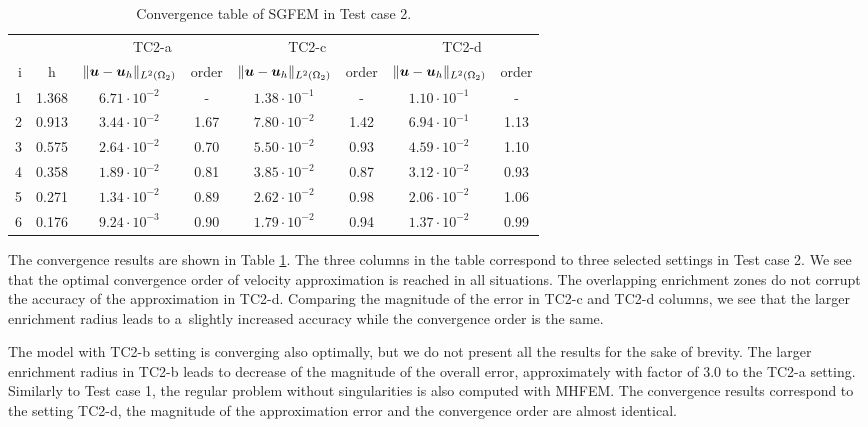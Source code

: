 \begin{table}[!htb]
\begin{center}
\bgroup
\def\arraystretch{1.2}
\setlength\tabcolsep{5pt}
\begin{tabular}{rc|cc|cc|cc}
\toprule
\multicolumn{2}{c|}{} & \multicolumn{2}{c|}{ TC2-a } & \multicolumn{2}{c|}{ TC2-c } & \multicolumn{2}{c}{TC2-d}\\ [3pt] %
i & h & $\|\mathbf{\boldsymbol{u}}-\mathbf{\boldsymbol{u}}_h\|_{L^2(\Omega_2)}$ & order & $\|\mathbf{\boldsymbol{u}}-\mathbf{\boldsymbol{u}}_h\|_{L^2(\Omega_2)}$
    & order & $\|\mathbf{\boldsymbol{u}}-\mathbf{\boldsymbol{u}}_h\|_{L^2(\Omega_2)}$ & order \\ [3pt] \midrule
1 & 1.368 &  $6.71\cdot10^{-2}$  &  -   &  $1.38\cdot10^{-1}$  &  -   &  $1.10\cdot10^{-1}$ &   -   \\
2 & 0.913 &  $3.44\cdot10^{-2}$  & 1.67 &  $7.80\cdot10^{-2}$  & 1.42 &  $6.94\cdot10^{-1}$ &  1.13 \\
3 & 0.575 &  $2.64\cdot10^{-2}$  & 0.70 &  $5.50\cdot10^{-2}$  & 0.93 &  $4.59\cdot10^{-2}$ &  1.10 \\
4 & 0.358 &  $1.89\cdot10^{-2}$  & 0.81 &  $3.85\cdot10^{-2}$  & 0.87 &  $3.12\cdot10^{-2}$ &  0.93 \\
5 & 0.271 &  $1.34\cdot10^{-2}$  & 0.89 &  $2.62\cdot10^{-2}$  & 0.98 &  $2.06\cdot10^{-2}$ &  1.06 \\
6 & 0.176 &  $9.24\cdot10^{-3}$  & 0.90 &  $1.79\cdot10^{-2}$  & 0.94 &  $1.37\cdot10^{-2}$ &  0.99 \\
\bottomrule
\end{tabular}
\caption{Convergence table of SGFEM in Test case 2.}
\label{tab:mh_tc2_convergence}
\egroup
\end{center}
\end{table}

The convergence results are shown in Table \ref{tab:mh_tc2_convergence}.
The three columns in the table correspond to three selected settings in Test case 2.
We see that the optimal convergence order of velocity approximation is reached in all situations.
The overlapping enrichment zones do not corrupt the accuracy of the approximation in TC2-d.
Comparing the magnitude of the error in TC2-c and TC2-d columns, we see that the larger enrichment radius leads
to a~slightly increased accuracy while the convergence order is the same.

The model with TC2-b setting is converging also optimally, but we do not present all the results for the sake of brevity.
The larger enrichment radius in TC2-b leads to decrease of the magnitude of the overall error,
approximately with factor of 3.0 to the TC2-a setting.
Similarly to Test case 1, the regular problem without singularities is also computed with MHFEM.
The convergence results correspond to the setting TC2-d,
the magnitude of the approximation error and the convergence order are almost identical.

